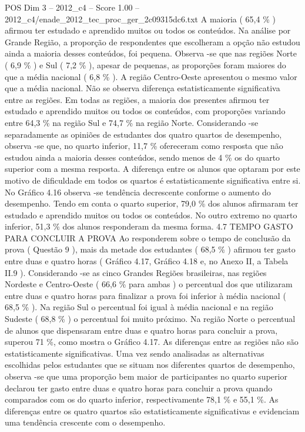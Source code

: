 \begin{textsample}{POS Dim 3 – 2012\_c4 – Score 1.00 – 2012\_c4/enade\_2012\_tec\_proc\_ger\_2c09315dc6.txt}
A maioria ( 65,4 \% ) afirmou ter estudado e aprendido muitos ou todos os conteúdos.
Na análise por Grande Região, a proporção de respondentes que escolheram a opção não estudou ainda a maioria desses conteúdos, foi pequena.
Observa -se que nas regiões Norte ( 6,9 \% ) e Sul ( 7,2 \% ), apesar de pequenas, as proporções foram maiores do que a média nacional ( 6,8 \% ).
A região Centro-Oeste apresentou o mesmo valor que a média nacional.
Não se observa diferença estatisticamente significativa entre as regiões.
Em todas as regiões, a maioria dos presentes afirmou ter estudado e aprendido muitos ou todos os conteúdos, com proporções variando entre 64,3 \% na região Sul e 74,7 \% na região Norte.
Considerando -se separadamente as opiniões de estudantes dos quatro quartos de desempenho, observa -se que, no quarto inferior, 11,7 \% ofereceram como resposta que não estudou ainda a maioria desses conteúdos, sendo menos de 4 \% os do quarto superior com a mesma resposta.
A diferença entre os alunos que optaram por este motivo de dificuldade em todos os quartos é estatisticamente significativa entre si.
No Gráfico 4.16 observa -se tendência decrescente conforme o aumento do desempenho.
Tendo em conta o quarto superior, 79,0 \% dos alunos afirmaram ter estudado e aprendido muitos ou todos os conteúdos.
No outro extremo no quarto inferior, 51,3 \% dos alunos responderam da mesma forma. 4.7 TEMPO GASTO PARA CONCLUIR A PROVA Ao responderem sobre o tempo de conclusão da prova ( Questão 9 ), mais da metade dos estudantes ( 68,5 \% ) afirmou ter gasto entre duas e quatro horas ( Gráfico 4.17, Gráfico 4.18 e, no Anexo II, a Tabela II.9 ).
Considerando -se as cinco Grandes Regiões brasileiras, nas regiões Nordeste e Centro-Oeste ( 66,6 \% para ambas ) o percentual dos que utilizaram entre duas e quatro horas para finalizar a prova foi inferior à média nacional ( 68,5 \% ).
Na região Sul o percentual foi igual à média nacional e na região Sudeste ( 68,8 \% ) o percentual foi muito próximo.
Na região Norte o percentual de alunos que dispensaram entre duas e quatro horas para concluir a prova, superou 71 \%, como mostra o Gráfico 4.17.
As diferenças entre as regiões não são estatisticamente significativas.
Uma vez sendo analisadas as alternativas escolhidas pelos estudantes que se situam nos diferentes quartos de desempenho, observa -se que uma proporção bem maior de participantes no quarto superior declarou ter gasto entre duas e quatro horas para concluir a prova quando comparados com os do quarto inferior, respectivamente 78,1 \% e 55,1 \%.
As diferenças entre os quatro quartos são estatisticamente significativas e evidenciam uma tendência crescente com o desempenho.

\end{textsample}
